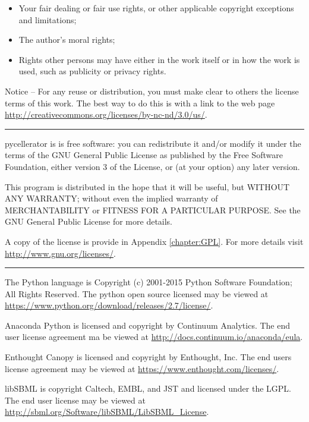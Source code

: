 \begin{small}
\begin{itemize}
\begin{itemize}
\setlength{\itemsep}{0pt}
\setlength{\parsep}{0pt}
\setlength{\topsep}{0pt}
\setlength{\parskip}{0pt}
\item Your fair dealing or fair use rights, or other applicable copyright exceptions and limitations;
\item The author's moral rights;
\item Rights other persons may have either in the work itself or in how the work is used, such as publicity or privacy rights.
\end{itemize}
\end{itemize}
\vspace{-12pt} 
Notice -- For any reuse or distribution, you must make clear to others the license terms of this work. The best way to do this is with a link to the web page \url{http://creativecommons.org/licenses/by-nc-nd/3.0/us/}. \\

\hrule 
pycellerator is is free software: you can redistribute it and/or modify
    it under the terms of the GNU General Public License as published by
    the Free Software Foundation, either version 3 of the License, or
    (at your option) any later version.

    This program is distributed in the hope that it will be useful,
    but WITHOUT ANY WARRANTY; without even the implied warranty of
    MERCHANTABILITY or FITNESS FOR A PARTICULAR PURPOSE.  See the
    GNU General Public License for more details.
    
    A copy of the license is provide in Appendix \ref{chapter:GPL}. For more details visit \url{http://www.gnu.org/licenses/}. 
    
    \hrule
    
    The Python language is Copyright (c) 2001-2015 Python Software Foundation; All Rights Reserved.  The python open source licensed may be viewed at \url{https://www.python.org/download/releases/2.7/license/}.  


Anaconda Python is licensed and copyright by Continuum Analytics. The end user license agreement ma be viewed at \url{http://docs.continuum.io/anaconda/eula}. 

Enthought Canopy is licensed and copyright by Enthought, Inc. The end users license agreement may be viewed at \url{https://www.enthought.com/licenses/}. 

libSBML is copyright Caltech, EMBL, and JST and licensed under the LGPL. The end user license may be viewed at \url{http://sbml.org/Software/libSBML/LibSBML_License}. 

\end{small}
